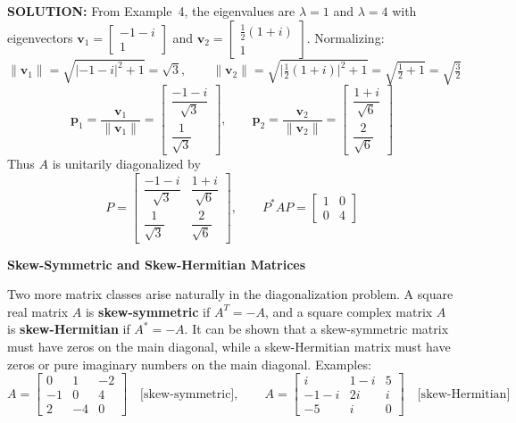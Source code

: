 \documentclass{article}
\newcommand{\redheading}[1]{{\vspace{2mm}\noindent\Large\bfseries\color{red!55!black} #1\par}\vspace{2mm}}
\begin{document}
\textbf{SOLUTION:}
From Example~4, the eigenvalues are $\lambda=1$ and $\lambda=4$ with eigenvectors
$\mathbf{v}_1 = \begin{bmatrix}-1-i\\1\end{bmatrix}$
and
$\mathbf{v}_2 = \begin{bmatrix}\tfrac{1}{2}(1+i)\\1\end{bmatrix}$.
Normalizing:
\[
  \|\mathbf{v}_1\| = \sqrt{|{-1-i}|^2+1} = \sqrt{3},
  \qquad
  \|\mathbf{v}_2\| = \sqrt{\bigl|\tfrac{1}{2}(1+i)\bigr|^2+1} = \sqrt{\tfrac{1}{2}+1} = \sqrt{\tfrac{3}{2}}
\]
\[
  \mathbf{p}_1 = \frac{\mathbf{v}_1}{\|\mathbf{v}_1\|} = \begin{bmatrix}\dfrac{-1-i}{\sqrt{3}}\\[4pt]\dfrac{1}{\sqrt{3}}\end{bmatrix},
  \qquad
  \mathbf{p}_2 = \frac{\mathbf{v}_2}{\|\mathbf{v}_2\|} = \begin{bmatrix}\dfrac{1+i}{\sqrt{6}}\\[4pt]\dfrac{2}{\sqrt{6}}\end{bmatrix}
\]
Thus $A$ is unitarily diagonalized by
\[
  P = \begin{bmatrix} \dfrac{-1-i}{\sqrt{3}} & \dfrac{1+i}{\sqrt{6}} \\[6pt] \dfrac{1}{\sqrt{3}} & \dfrac{2}{\sqrt{6}} \end{bmatrix},
  \qquad
  P^*AP = \begin{bmatrix} 1 & 0 \\ 0 & 4 \end{bmatrix}
\]

\redheading{Skew-Symmetric and Skew-Hermitian Matrices}

Two more matrix classes arise naturally in the diagonalization problem. A square real matrix $A$ is \textbf{skew-symmetric} if $A^T = -A$, and a square complex matrix $A$ is \textbf{skew-Hermitian} if $A^* = -A$. It can be shown that a skew-symmetric matrix must have zeros on the main diagonal, while a skew-Hermitian matrix must have zeros or pure imaginary numbers on the main diagonal. Examples:
\[
  A = \begin{bmatrix} 0 & 1 & -2 \\ -1 & 0 & 4 \\ 2 & -4 & 0 \end{bmatrix}
  \quad\text{[skew-symmetric]},
  \qquad
  A = \begin{bmatrix} i & 1-i & 5 \\ -1-i & 2i & i \\ -5 & i & 0 \end{bmatrix}
  \quad\text{[skew-Hermitian]}
\]
\end{document}

